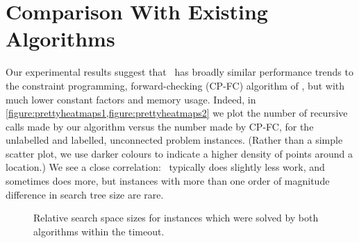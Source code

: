 \section{Comparison With Existing Algorithms}
\label{sec:comparison}

Our experimental results suggest that \McSplit\ has broadly similar performance
trends to the constraint programming, forward-checking (CP-FC) algorithm of
\citet{DBLP:conf/cp/NdiayeS11}, but with much lower constant factors and memory usage. Indeed,
in \cref{figure:prettyheatmaps1,figure:prettyheatmaps2} we plot the number of
recursive calls made by our algorithm versus the number made by
CP-FC, for the unlabelled and labelled, unconnected problem
instances. (Rather than a simple scatter plot, we use darker colours to
indicate a higher density of points around a location.) We see a close
correlation: \McSplit\ typically does slightly less work, and sometimes does more, but
instances with more than one order of magnitude difference in search tree size
are rare.

\begin{figure}[htb]
    \centering
    \caption{Relative search space sizes for instances which were solved by both algorithms within the timeout.}
    \label{figure:prettyheatmaps}
\end{figure}

